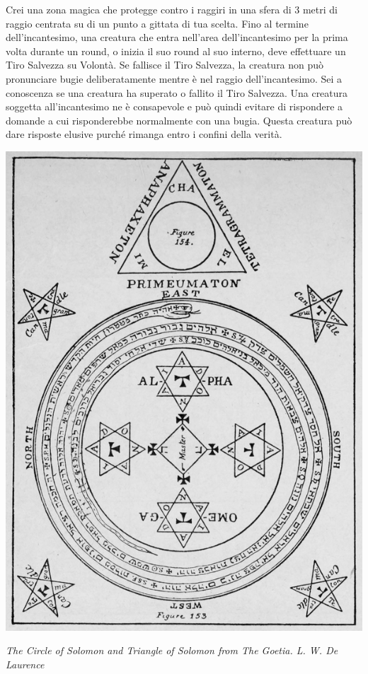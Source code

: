 \begin{multicols}{2}
Crei una zona magica che protegge contro i raggiri in una sfera di 3 metri di raggio centrata su di un punto a gittata di tua scelta. Fino al termine dell'incantesimo, una creatura che entra nell'area dell'incantesimo per la prima volta durante un round, o inizia il suo round al suo interno, deve effettuare un Tiro Salvezza su Volontà. Se fallisce il Tiro Salvezza, la creatura non può pronunciare bugie deliberatamente mentre è nel raggio dell'incantesimo. Sei a conoscenza se una creatura ha superato o fallito il Tiro Salvezza. Una creatura soggetta all'incantesimo ne è consapevole e può quindi evitare di rispondere a domande a cui risponderebbe normalmente con una bugia. Questa creatura può dare risposte elusive purché rimanga entro i confini della verità.


\bigskip


\end{multicols}

\vfill

\begin{center}
\includegraphics[keepaspectratio,width=0.5\linewidth]{immagini/Goetic_circle_from_The_Lesser_Key_of_Solomon.png}

\medskip

\emph{The Circle of Solomon and Triangle of Solomon from The Goetia. L. W. De Laurence}
\end{center}

